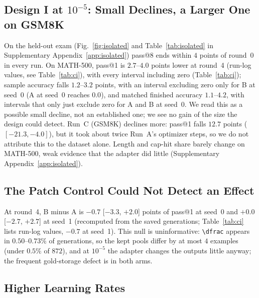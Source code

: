 \documentclass[runningheads]{llncs}
\begin{document}
\subsection{Design I at $10^{-5}$: Small Declines, a Larger One on GSM8K}
\label{sec:isolated}

On the held-out exam (Fig.~\ref{fig:isolated} and Table~\ref{tab:isolated} in Supplementary Appendix~\ref{app:isolated}) pass@8
ends within $4$ points of round~0 in every run. On MATH-500, pass@1 is
$2.7$--$4.0$ points lower at round~4 (run-log values, see Table~\ref{tab:ci}), with every interval including zero
(Table~\ref{tab:ci}); sample accuracy falls $1.2$--$3.2$ points, with an
interval excluding zero only for B at seed~0 (A at seed~0 reaches $0.0$), and
matched finished accuracy $1.1$--$4.2$, with intervals that only just exclude
zero for A and B at seed~0. We read this as a
possible small decline, not an established one; we see no gain
of the size the design could detect. Run~C
(GSM8K) declines more: pass@1 falls $12.7$ points ($[-21.3,-4.0]$), but it took about twice Run~A's optimizer steps, so we do not
attribute this to the dataset alone. Length and cap-hit share barely change on MATH-500, weak evidence that the adapter
did little (Supplementary Appendix~\ref{app:isolated}).

\subsection{The Patch Control Could Not Detect an Effect}
\label{sec:control}
\label{sec:prevalence}
\label{sec:answer-diversity}

At round~4,
B minus A is $-0.7$ [$-3.3$, $+2.0$] points of pass@1 at seed~0 and $+0.0$
[$-2.7$, $+2.7$] at seed~1 (recomputed from the saved generations; Table~\ref{tab:ci} lists run-log values, $-0.7$ at seed~1). This null is uninformative: \verb|\dfrac| appears
in $0.50$--$0.73\%$ of generations, so the kept pools differ by at most $4$
examples (under $0.5\%$ of $872$), and at $10^{-5}$ the adapter changes the outputs
little anyway; the frequent gold-storage defect is in both arms.

\subsection{Higher Learning Rates}
\label{sec:lrcheck}
\end{document}
